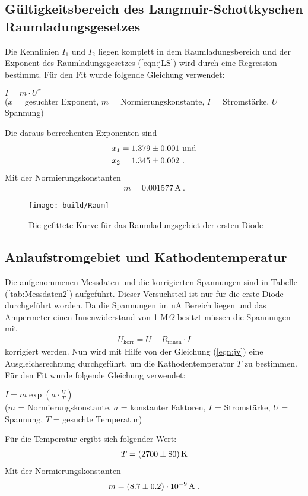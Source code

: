\subsection{Gültigkeitsbereich des Langmuir-Schottkyschen Raumladungsgesetzes}
\label{sec:R}
Die Kennlinien $I_1$ und $I_2$ liegen komplett in dem Raumladungsbereich und der Exponent des Raumladungsgesetzes (\ref{eqn:jLS}) wird durch eine Regression bestimmt. Für den Fit wurde folgende Gleichung verwendet:
\begin{center}
  $I = m \cdot U^x$ \\
  \small{($x$ = gesuchter Exponent, $m$ = Normierungskonstante, $I$ = Stromstärke, $U$ = Spannung)}
\end{center}
Die daraus berrechenten Exponenten sind
\begin{align*}
  x_1 & =  \num{1.379 +- 0.001}\ \text{und} \\
  x_2 & =  \num{1.345 +- 0.002} \ .
\end{align*}
Mit der Normierungskonstanten
\begin{align*}
  m = 0.001577 \, \text{A} \ .
\end{align*}

\begin{figure}[H]
  \centering
  \texttt{[image: build/Raum]}
  \caption{Die gefittete Kurve für das Raumladungsgebiet der ersten Diode}
  \label{fig:}
\end{figure}

\subsection{Anlaufstromgebiet und Kathodentemperatur}
\label{sec:A}
Die aufgenommenen Messdaten und die korrigierten Spannungen sind in Tabelle (\ref{tab:Messdaten2}) aufgeführt. Dieser Versuchsteil ist nur für die erste Diode durchgeführt worden. Da die Spannungen im nA Bereich liegen und das Ampermeter einen Innenwiderstand von 1 M$\Omega$ besitzt müssen die Spannungen mit
\begin{align*}
  U_\text{korr} = U - R_\text{innen} \cdot I
\end{align*}
korrigiert werden.
Nun wird mit Hilfe von der Gleichung (\ref{eqn:jv}) eine Ausgleichsrechnung durchgeführt, um die Kathodentemperatur $T$ zu bestimmen. Für den Fit wurde folgende Gleichung verwendet:
\begin{center}
  $I = m \exp\left( a \cdot \frac{U}{T} \right)$ \\
  \small{($m$ = Normierungskonstante, $a$ = konstanter Faktoren, $I$ = Stromstärke, $U$ = Spannung, $T$ = gesuchte Temperatur)}
\end{center}
Für die Temperatur ergibt sich folgender Wert:
\begin{align*}
  T = (\num{2700 +- 80}) \, \text{K}
\end{align*}
Mit der Normierungskonstanten
\begin{align*}
  m = (\num{8.7 +- 0.2}) \cdot 10^{-9}\, \text{A} \ .
\end{align*}

